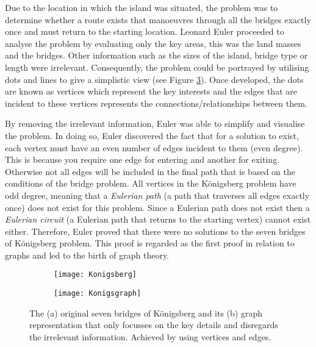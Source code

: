 Due to the location in which the island was situated, the problem was to determine whether a route exists that manoeuvres through all the bridges exactly once and must return to the starting location. Leonard Euler proceeded to analyse the problem by evaluating only the key areas, this was the land masses and the bridges. Other information such as the sizes of the island, bridge type or length were irrelevant. Consequently, the problem could be portrayed by utilising dots and lines \cite{pryor2011seven} to give a simplistic view (see Figure \ref{fig:Königsberg's Graph}). Once developed, the dots are known as vertices which represent the key interests and the edges that are incident to these vertices represents the connections/relationships between them.

By removing the irrelevant information, Euler was able to simplify and visualise the problem. In doing so, Euler discovered the fact that for a solution to exist, each vertex must have an even number of edges incident to them (even degree). This is because you require one edge for entering and another for exiting. Otherwise not all edges will be included in the final path that is based on the conditions of the bridge problem. All vertices in the Königsberg problem have odd degree, meaning that a \emph{Eulerian path} (a path that traverses all edges exactly once) does not exist for this problem. Since a Eulerian path does not exist then a \emph{Eulerian circuit} (a Eulerian path that returns to the starting vertex) cannot exist either. Therefore, Euler proved that there were no solutions to the seven bridges of Königsberg problem. This proof is regarded as the first proof in relation to graphs and led to the birth of graph theory.

\begin{figure}[!htb]
\centering
\begin{subfigure}{.45\textwidth}
	\texttt{[image: Konigsberg]}
	\caption{}
	\label{fig:Königsberg's Bridges}
\end{subfigure}
\hfill
\begin{subfigure}{.45\textwidth}
	\texttt{[image: Konigsgraph]}
	\caption{}
	\label{fig:Königsberg's Graph}
\end{subfigure}
\caption{The (a) original seven bridges of Königsberg and its (b) graph representation that only focusses on the key details and disregards the irrelevant information. Achieved by using vertices and edges.}
\end{figure}

